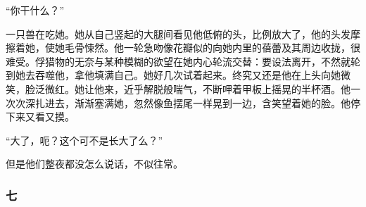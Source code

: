 \par “你干什么？”
\par 一只兽在吃她。她从自己竖起的大腿间看见他低俯的头，比例放大了，他的头发摩擦着她，使她毛骨悚然。他一轮急吻像花瓣似的向她内里的蓓蕾及其周边收拢，很难受。俘猎物的无奈与某种模糊的欲望在她内心轮流交替：要设法离开，不然就轮到她去吞噬他，拿他填满自己。她好几次试着起来。终究又还是他在上头向她微笑，脸泛微红。她让他来，近乎解脱般喘气，不断呷着甲板上摇晃的半杯酒。他一次次深扎进去，渐渐塞满她，忽然像鱼摆尾一样晃到一边，含笑望着她的脸。他停下来又看又摸。
\par “大了，呃？这个可不是长大了么？”
\par 但是他们整夜都没怎么说话，不似往常。



\subsubsection*{七}


